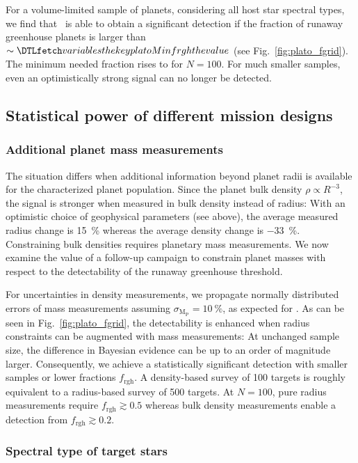 \documentclass[modern]{aastex631}
\begin{document}
For a volume-limited sample of  planets, considering all host star spectral types, we find that \plato\ is able to obtain a significant detection if the fraction of runaway greenhouse planets is larger than $\sim \var{platoMinfrgh}$ (see Fig.~\ref{fig:plato_fgrid}).
The minimum needed fraction rises to  for $N = 100$.
For much smaller samples, even an optimistically strong signal can no longer be detected.




\subsection{Statistical power of different mission designs}\label{sec:statpower_missions}
\subsubsection{Additional planet mass measurements}
The situation differs when additional information beyond planet radii is available for the characterized planet population.
Since the planet bulk density $\rho \propto R^{-3}$, the signal is stronger when measured in bulk density instead of radius:
With an optimistic choice of geophysical parameters (see above), the average measured radius change is \SI{+15}{\percent} whereas the average density change is \SI{-33}{\percent}.
Constraining bulk densities requires planetary mass measurements.
We now examine the value of a follow-up campaign to constrain planet masses with respect to the detectability of the runaway greenhouse threshold.

For uncertainties in density measurements, we propagate normally distributed errors of mass measurements assuming $\sigma_\mathrm{M_\mathrm{P}} = \SI{10}{\percent}$, as expected for \plato.
As can be seen in Fig.~\ref{fig:plato_fgrid}, the detectability is enhanced when radius constraints can be augmented with mass measurements: At unchanged sample size, the difference in Bayesian evidence can be up to an order of magnitude larger.
Consequently, we achieve a statistically significant detection with smaller samples or lower fractions $f_\mathrm{rgh}$.
A density-based survey of 100 targets is roughly equivalent to a radius-based survey of 500 targets.
At $N=100$, pure radius measurements require $f_\mathrm{rgh} \gtrsim 0.5$ whereas bulk density measurements enable a detection from $f_\mathrm{rgh} \gtrsim 0.2$.


\subsubsection{Spectral type of target stars}
\end{document}
